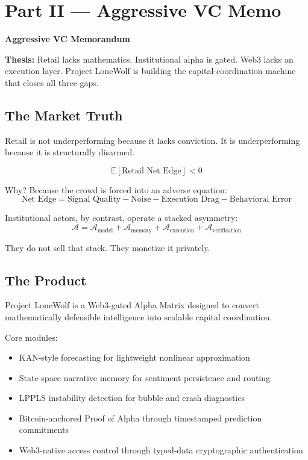 \documentclass[11pt]{article}
\begin{document}
\newpage

\section*{Part II --- Aggressive VC Memo}

\begin{center}
{\LARGE\bfseries Aggressive VC Memorandum}
\end{center}

\begin{aggressivebox}
\textbf{Thesis:} Retail lacks mathematics. Institutional alpha is gated. Web3 lacks an execution layer. Project LoneWolf is building the capital-coordination machine that closes all three gaps.
\end{aggressivebox}

\subsection*{The Market Truth}

Retail is not underperforming because it lacks conviction. It is underperforming because it is structurally disarmed.

\[
\mathbb{E}[\text{Retail Net Edge}] < 0
\]

Why? Because the crowd is forced into an adverse equation:
\[
\text{Net Edge} = \text{Signal Quality} - \text{Noise} - \text{Execution Drag} - \text{Behavioral Error}
\]

Institutional actors, by contrast, operate a stacked asymmetry:
\[
\mathcal{A}=
\mathcal{A}_{\text{model}}+
\mathcal{A}_{\text{memory}}+
\mathcal{A}_{\text{execution}}+
\mathcal{A}_{\text{verification}}
\]

They do not sell that stack. They monetize it privately.

\subsection*{The Product}

Project LoneWolf is a Web3-gated Alpha Matrix designed to convert mathematically defensible intelligence into scalable capital coordination.

Core modules:
\begin{itemize}[leftmargin=1.5em]
  \item KAN-style forecasting for lightweight nonlinear approximation
  \item State-space narrative memory for sentiment persistence and routing
  \item LPPLS instability detection for bubble and crash diagnostics
  \item Bitcoin-anchored Proof of Alpha through timestamped prediction commitments
  \item Web3-native access control through typed-data cryptographic authentication
\end{itemize}
\end{document}
